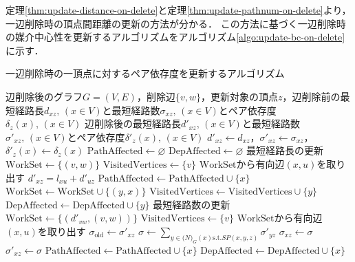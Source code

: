 定理\ref{thm:update-distance-on-delete}と定理\ref{thm:update-pathnum-on-delete}より，一辺削除時の頂点間距離の更新の方法が分かる．
この方法に基づく一辺削除時の媒介中心性を更新するアルゴリズムをアルゴリズム\ref{algo:update-bc-on-delete}に示す．

\begin{algorithm}[H]
  \caption{一辺削除時の一頂点に対するペア依存度を更新するアルゴリズム}
  \label{algo:update-pd-on-delete}
  \begin{algorithmic}[1]
    \Require 辺削除後のグラフ$G=(V,E)$，削除辺$\{v,w\}$，更新対象の頂点$z$，辺削除前の最短経路長$d_{xz},\,(x\in V)$と最短経路数$\sigma_{xz},\,(x\in V)$とペア依存度$\delta_z(x),\,(x\in V)$
    \Ensure 辺削除後の最短経路長$d'_{xz},\,(x\in V)$と最短経路数$\sigma'_{xz},\,(x\in V)$とペア依存度$\delta'_z(x),\,(x\in V)$
    \State $d'_{xz}\gets d_{xz}$，$\sigma'_{xz}\gets\sigma_{xz}$，$\delta'_z(x)\gets\delta_z(x)$
    \State $\mathrm{PathAffected}\gets\varnothing$
    \State $\mathrm{DepAffected}\gets\varnothing$
    \State\Comment 最短経路長の更新
    \State $\mathrm{WorkSet}\gets\{(v,w)\}$
    \State $\mathrm{VisitedVertices}\gets\{v\}$
    \State $\mathrm{WorkSet}$から有向辺$(x,u)$を取り出す
    \State $d'_{xz}=l_{xu}+d'_{uz}$
    \State $\mathrm{PathAffected}\gets\mathrm{PathAffected}\cup\{x\}$
    \State $\mathrm{WorkSet}\gets\mathrm{WorkSet}\cup\{(y,x)\}$
    \State $\mathrm{VisitedVertices}\gets\mathrm{VisitedVertices}\cup\{y\}$
    \EndFor
    \State $\mathrm{DepAffected}\gets\mathrm{DepAffected}\cup\{y\}$
    \EndFor
    \EndIf
    \EndWhile
    \State\Comment 最短経路数の更新
    \State $\mathrm{WorkSet}\gets\{(d'_{vw}, (v, w))\}$
    \State $\mathrm{VisitedVertices}\gets\{v\}$
    \State $\mathrm{WorkSet}$から有向辺$(x,u)$を取り出す
    \State $\sigma_{\mathrm{old}}\gets\sigma'_{xz}$
    \State $\sigma\gets\sum_{y\in \mathcal(N)_G(x)\mathrm{s.t.}SP(x,y,z)}\sigma'_{yz}$
    \State $\sigma_{xz}\gets\sigma$
    \State $\sigma'_{xz}\gets\sigma$
    \State $\mathrm{PathAffected}\gets\mathrm{PathAffected}\cup\{x\}$
    \State $\mathrm{DepAffected}\gets\mathrm{DepAffected}\cup\{x\}$

\end{algorithmic}
\end{algorithm}

